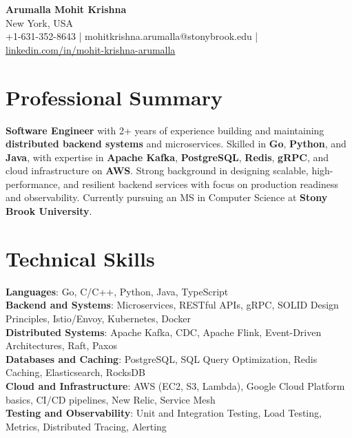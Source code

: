 \documentclass[letterpaper,11pt]{article}
\begin{document}
\begin{center}
  {\Large \textbf{Arumalla Mohit Krishna}} \\
  New York, USA \\
  +1-631-352-8643 \enspace | \enspace mohitkrishna.arumalla@stonybrook.edu \enspace | \enspace \href{https://www.linkedin.com/in/mohit-krishna-arumalla}{linkedin.com/in/mohit-krishna-arumalla}
\end{center}

\section{Professional Summary}
  \begin{itemize}[leftmargin=0.15in, label={}]
    \small{\item{
     \textbf{Software Engineer} with 2+ years of experience building and maintaining \textbf{distributed backend systems} and microservices. Skilled in \textbf{Go}, \textbf{Python}, and \textbf{Java}, with expertise in \textbf{Apache Kafka}, \textbf{PostgreSQL}, \textbf{Redis}, \textbf{gRPC}, and cloud infrastructure on \textbf{AWS}. Strong background in designing scalable, high-performance, and resilient backend services with focus on production readiness and observability. Currently pursuing an MS in Computer Science at \textbf{Stony Brook University}.
    }}
  \end{itemize}
\vspace{-16pt}

\section{Technical Skills}
 \begin{itemize}[leftmargin=0.15in, label={}]
    \small{\item{
     \textbf{Languages}: Go, C/C++, Python, Java, TypeScript \\
     \textbf{Backend and Systems}: Microservices, RESTful APIs, gRPC, SOLID Design Principles, Istio/Envoy, Kubernetes, Docker \\
     \textbf{Distributed Systems}: Apache Kafka, CDC, Apache Flink, Event-Driven Architectures, Raft, Paxos \\
     \textbf{Databases and Caching}: PostgreSQL, SQL Query Optimization, Redis Caching, Elasticsearch, RocksDB \\
     \textbf{Cloud and Infrastructure}: AWS (EC2, S3, Lambda), Google Cloud Platform basics, CI/CD pipelines, New Relic, Service Mesh \\
     \textbf{Testing and Observability}: Unit and Integration Testing, Load Testing, Metrics, Distributed Tracing, Alerting
    }}
 \end{itemize}
\vspace{-16pt}
\end{document}
